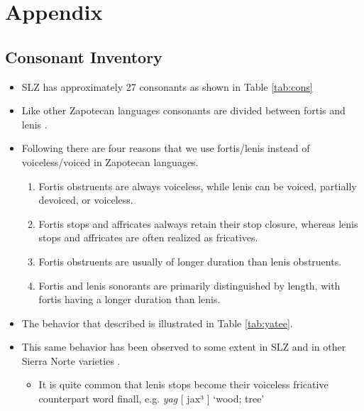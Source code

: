 \documentclass[12pt, letterpaper]{article}
\begin{document}
\printbibliography[heading=bibintoc]


\section*{Appendix} 
\subsection*{Consonant Inventory} \label{sec:Consonants}

\begin{itemize}
	\item SLZ has approximately 27 consonants as shown in Table \ref{tab:cons}

	\item Like other Zapotecan languages consonants are divided between fortis and lenis \citep{nellisFortisLenisCajonos1980,jaegerInitialConsonantClusters1982,uchiharaFortisLenisGlides2016}.

	\item Following \citet{jaegerInitialConsonantClusters1982} there are four reasons that we use fortis/lenis instead of voiceless/voiced in Zapotecan languages.
	\begin{enumerate}
		\item Fortis obstruents are always voiceless, while lenis can be voiced, partially devoiced, or voiceless.
		\item Fortis stops and affricates aalways retain their stop closure, whereas lenis stops and affricates are often realized as fricatives.
		\item Fortis obstruents are usually of longer duration than lenis obstruents.
		\item Fortis and lenis sonorants are primarily distinguished by length, with fortis having a longer duration than lenis. 
	\end{enumerate}
	\item The behavior that \citet{jaegerInitialConsonantClusters1982} described is illustrated in Table \ref{tab:yatee}. 
	\item This same behavior has been observed to some extent in SLZ and in other Sierra Norte varieties \citep{sonnenscheinDescriptiveGrammarSan2005}.
	\begin{itemize}
		\item It is quite common that lenis stops become their voiceless fricative counterpart word finall, e.g. \textit{yag} [ jax³ ] `wood; tree'
	\end{itemize}
\end{itemize}
\end{document}
